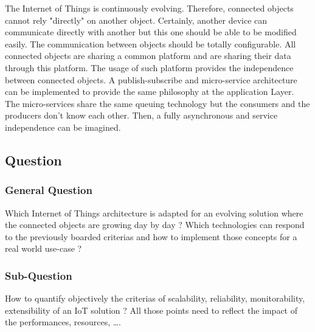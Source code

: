 \documentclass[11pt]{article}
\begin{document}
The Internet of Things is continuously evolving. Therefore, connected objects cannot rely "directly" on another object. Certainly, another device can communicate directly with another but this one should be able to be modified easily. The communication between objects should be totally configurable. All connected objects are sharing a common platform and are sharing their data through this platform. The usage of such platform provides the independence between connected objects. A publish-subscribe and micro-service architecture can be implemented to provide the same philosophy at the application Layer. The micro-services share the same queuing technology but the consumers and the producers don't know each other. Then, a fully asynchronous and service independence can be imagined.

\subsection{Question}

\subsubsection{General Question}

Which Internet of Things architecture is adapted for an evolving solution where the connected objects are growing day by day ? Which technologies can respond to the previously boarded criterias and how to implement those concepts for a real world use-case ? 

\subsubsection{Sub-Question}

How to quantify objectively the criterias of scalability, reliability, monitorability, extensibility of an IoT solution ? All those points need to reflect the impact of the performances, resources, \ldots.
\end{document}

